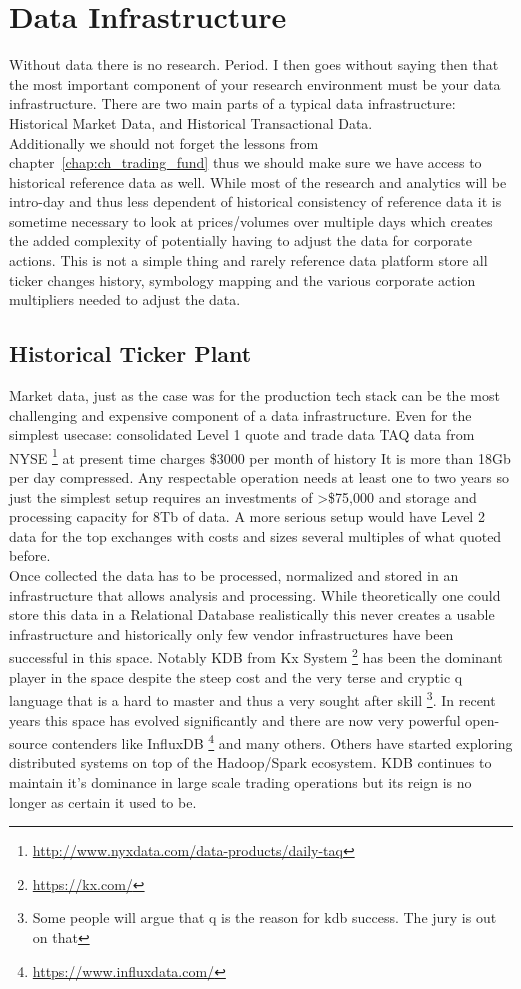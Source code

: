 \section{Data Infrastructure}
Without data there is no research. Period. I then goes without saying then that the most important component of your research environment must be your data infrastructure. There are two main parts of a typical data infrastructure: Historical Market Data, and Historical Transactional Data. \\

Additionally we  should not forget the lessons from chapter~\ref{chap:ch_trading_fund} thus we should make sure we have access to historical reference data as well. While most of the research and analytics will be intro-day and thus less dependent of historical consistency of reference data it is sometime necessary to look at prices/volumes over multiple days which creates the added complexity of potentially having to adjust the data for corporate actions. This is not a simple thing and rarely reference data platform store all ticker changes history, symbology mapping and the various corporate action multipliers needed to adjust the data.

\subsection{Historical Ticker Plant}
Market data, just as the case was for the production tech stack can be the most challenging and expensive component of a data infrastructure. Even for  the simplest usecase: consolidated Level 1 quote and trade data TAQ data from NYSE \footnote{\url{http://www.nyxdata.com/data-products/daily-taq}} at present time charges \$3000 per month of history It is more than 18Gb per day compressed. Any respectable operation needs at least one to two years so just the simplest setup requires an investments of >\$75,000 and storage and processing capacity for 8Tb of data. A more serious setup would have Level 2 data for the top exchanges with costs and sizes several multiples  of what quoted before. \\
Once collected the data has to be processed, normalized and stored in an infrastructure that allows analysis and processing. While theoretically one could store this data in a Relational Database realistically this never creates a usable infrastructure and historically only few vendor infrastructures have been successful in this space. Notably KDB from Kx System \footnote{\url{https://kx.com/}} has been the dominant player in the space despite the steep cost and the very terse and cryptic q language that is a hard to master and thus a very sought after skill \footnote{Some people will argue that q is the reason for kdb success. The jury is out on that}. In recent years this space has evolved significantly and there are now very powerful open-source contenders like InfluxDB \footnote{\url{https://www.influxdata.com/}} and many others. Others have started exploring distributed systems on top of the Hadoop/Spark ecosystem. KDB continues to maintain it's dominance in large scale trading operations but its reign is no longer as certain it used to be.\\

